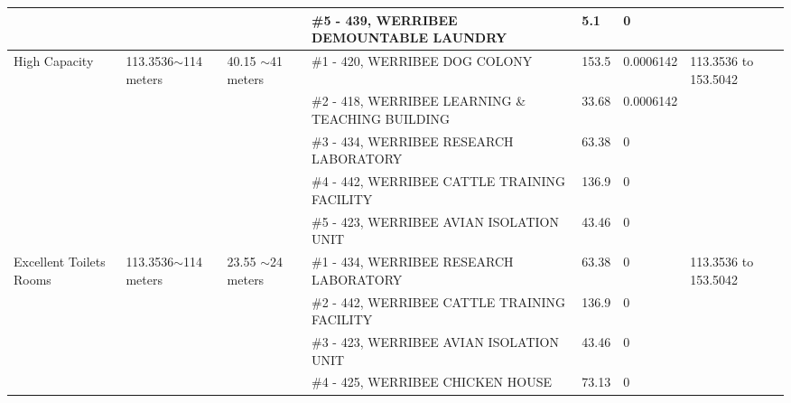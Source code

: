 \begin{table}[H]
{\begin{tabular}{|l|l|l|l|l|l|l|}
                        &                          &                                                 & \#5 - 439, WERRIBEE DEMOUNTABLE LAUNDRY               & 5.1           & 0               &                           \\ \hline
High Capacity           & 113.3536$\sim$114 meters & 40.15 $\sim$41 meters                           & \#1 - 420, WERRIBEE DOG COLONY                        & 153.5         & 0.0006142       & 113.3536 to 153.5042      \\ \hline
                        &                          &                                                 & \#2 - 418, WERRIBEE LEARNING \& TEACHING BUILDING     & 33.68         & 0.0006142       &                           \\ \hline
                        &                          &                                                 & \#3 - 434, WERRIBEE RESEARCH LABORATORY               & 63.38         & 0               &                           \\ \hline
                        &                          &                                                 & \#4 - 442, WERRIBEE CATTLE TRAINING FACILITY          & 136.9         & 0               &                           \\ \hline
                        &                          &                                                 & \#5 - 423, WERRIBEE AVIAN ISOLATION UNIT              & 43.46         & 0               &                           \\ \hline
Excellent Toilets Rooms & 113.3536$\sim$114 meters & 23.55 $\sim$24 meters                           & \#1 - 434, WERRIBEE RESEARCH LABORATORY               & 63.38         & 0               & 113.3536 to 153.5042      \\ \hline
                        &                          &                                                 & \#2 - 442, WERRIBEE CATTLE TRAINING FACILITY          & 136.9         & 0               &                           \\ \hline
                        &                          &                                                 & \#3 - 423, WERRIBEE AVIAN ISOLATION UNIT              & 43.46         & 0               &                           \\ \hline
                        &                          &                                                 & \#4 - 425, WERRIBEE CHICKEN HOUSE                     & 73.13         & 0               &                           \\ \hline

\end{tabular}}
\end{table}
